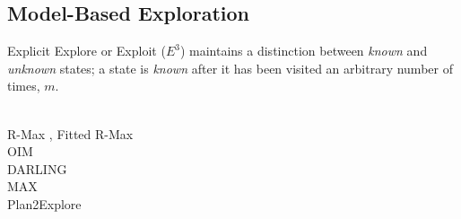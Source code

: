 \subsection{Model-Based Exploration}
Explicit Explore or Exploit ($E^3$) \cite{Kearns+Singh:2002} maintains a distinction between \textit{known} and \textit{unknown} states; a state is \textit{known} after it has been visited an arbitrary number of times, $m$.

\\ R-Max \cite{10.1162/153244303765208377}, Fitted R-Max \cite{SARA07-jong}
\\ OIM \cite{10.1145/1390156.1390288}
\\ DARLING \cite{AIJ16-leonetti}
\\ MAX \cite{DBLP:journals/corr/abs-1810-12162}
\\ Plan2Explore \cite{plan2explore}




